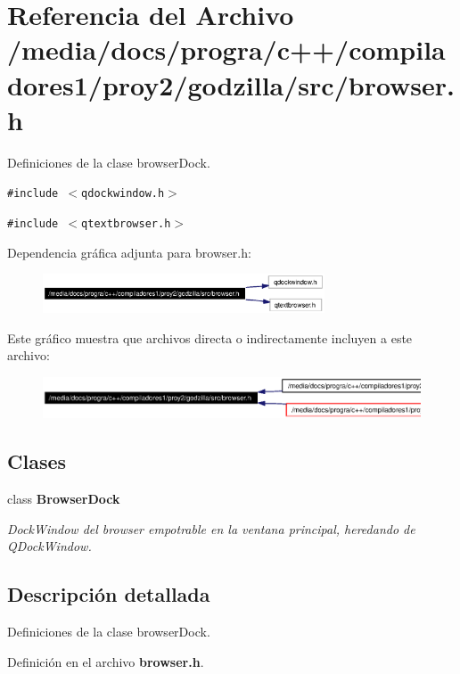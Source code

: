 \section{Referencia del Archivo /media/docs/progra/c++/compiladores1/proy2/godzilla/src/browser.h}
\label{browser_8h}
Definiciones de la clase browser\-Dock. 

{\tt \#include $<$qdockwindow.h$>$}\par
{\tt \#include $<$qtextbrowser.h$>$}\par


Dependencia gr\'{a}fica adjunta para browser.h:\begin{figure}[H]
\begin{center}
\leavevmode
\includegraphics[width=237pt]{browser_8h__incl}
\end{center}
\end{figure}


Este gr\'{a}fico muestra que archivos directa o indirectamente incluyen a este archivo:\begin{figure}[H]
\begin{center}
\leavevmode
\includegraphics[width=359pt]{browser_8h__dep__incl}
\end{center}
\end{figure}
\subsection*{Clases}
\begin{CompactItemize}
\item 
class {\bf Browser\-Dock}
\begin{CompactList}\small\item\em Dock\-Window del browser empotrable en la ventana principal, heredando de QDock\-Window. \item\end{CompactList}\end{CompactItemize}


\subsection{Descripci\'{o}n detallada}
Definiciones de la clase browser\-Dock. 



Definici\'{o}n en el archivo {\bf browser.h}.